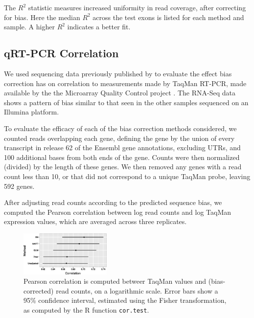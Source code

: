 \documentclass{bioinfo}
\begin{document}
\begin{table}
{
    The $R^2$ statistic measures increased uniformity in read coverage, after
    correcting for bias.  Here the median $R^2$ across the test exons is listed
    for each method and sample. A higher $R^2$ indicates a better fit.
}
\end{table}


\subsection{qRT-PCR Correlation}

We used sequencing data previously published by \citet{Au2010} to evaluate the
effect bias correction has on correlation to measurements made by TaqMan RT-PCR,
made available by the the Microarray Quality Control project \cite{Shi2006}. The
RNA-Seq data shows a pattern of bias similar to that seen in the other samples
sequenced on an Illumina platform.

To evaluate the efficacy of each of the bias correction methods considered, we
counted reads overlapping each gene, defining the gene by the union of every
transcript in release 62 of the Ensembl gene annotations, excluding UTRs, and
100 additional bases from both ends of the gene. Counts were then normalized
(divided) by the length of these genes. We then removed any genes with a read
count less than 10, or that did not correspond to a unique TaqMan probe, leaving
592 genes.

After adjusting read counts according to the predicted sequence bias, we
computed the Pearson correlation between log read counts and log TaqMan
expression values, which are averaged across three replicates.


\begin{figure}
\centerline{\includegraphics[width=0.4\textwidth]{pcrcor.eps}}
\caption{
    Pearson correlation is computed betweer TaqMan values and (bias-corrected)
    read counts, on a logarithmic scale.
    Error bars show a 95\% confidence interval, estimated using the Fisher
    transformation, as computed by the R function \texttt{cor.test}.
}
\label{fig:pcrcor}
\end{figure}
\end{document}
